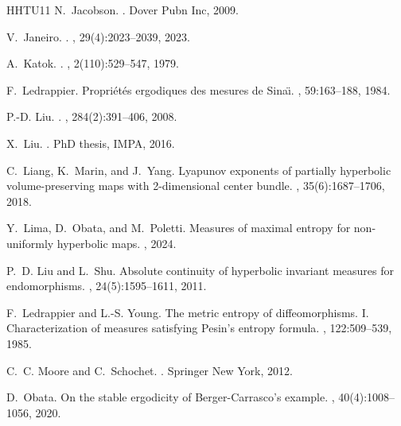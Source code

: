 \documentclass[11pt,letterpaper,reqno]{article}
\begin{document}
\begin{thebibliography}{HHTU11}
N.~Jacobson.
.
\newblock Dover Pubn Inc, 2009.

V.~Janeiro.
.
, 29(4):2023--2039,
  2023.

A.~Katok.
.
, 2(110):529--547, 1979.

F.~Ledrappier.
\newblock Propri\'et\'es ergodiques des mesures de {Sina{\"\i}}.
, 59:163--188, 1984.

P.-D. Liu.
.
, 284(2):391--406, 2008.

X.~Liu.
.
\newblock PhD thesis, IMPA, 2016.

C.~Liang, K.~Marin, and J.~Yang.
\newblock Lyapunov exponents of partially hyperbolic volume-preserving maps
  with 2-dimensional center bundle.
, 35(6):1687--1706, 2018.

Y.~Lima, D.~Obata, and M.~Poletti.
\newblock Measures of maximal entropy for non-uniformly hyperbolic maps.
, 2024.

P.~D. Liu and L.~Shu.
\newblock Absolute continuity of hyperbolic invariant measures for
  endomorphisms.
, 24(5):1595--1611, 2011.

F.~Ledrappier and L.-S. Young.
\newblock The metric entropy of diffeomorphisms. {I}. {C}haracterization of
  measures satisfying {P}esin's entropy formula.
, 122:509--539, 1985.

C.~C. Moore and C.~Schochet.
.
\newblock Springer New York, 2012.

D.~Obata.
\newblock On the stable ergodicity of {B}erger-{C}arrasco's example.
, 40(4):1008--1056, 2020.


\end{thebibliography}
\end{document}
